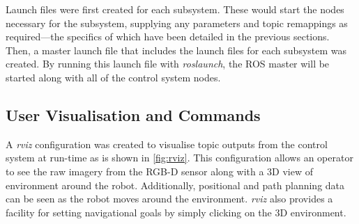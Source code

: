 Launch files were first created for each subsystem. These would start the nodes necessary for the subsystem, supplying any parameters and topic remappings as required---the specifics of which have been detailed in the previous sections. Then, a master launch file that includes the launch files for each subsystem was created. By running this launch file with \emph{roslaunch}, the ROS master will be started along with all of the control system nodes.

\subsection{User Visualisation and Commands}

A \emph{rviz} configuration was created to visualise topic outputs from the control system at run-time as is shown in \autoref{fig:rviz}. This configuration allows an operator to see the raw imagery from the RGB-D sensor along with a 3D view of environment around the robot. Additionally, positional and path planning data can be seen as the robot moves around the environment. \emph{rviz} also provides a facility for setting navigational goals by simply clicking on the 3D environment.